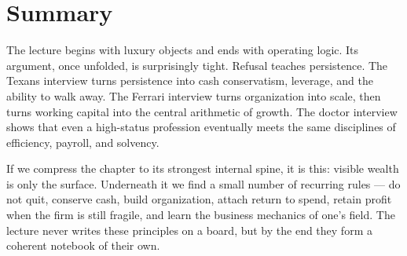\section{Summary}

The lecture begins with luxury objects and ends with operating logic. Its argument, once unfolded, is surprisingly tight. Refusal teaches persistence. The Texans interview turns persistence into cash conservatism, leverage, and the ability to walk away. The Ferrari interview turns organization into scale, then turns working capital into the central arithmetic of growth. The doctor interview shows that even a high-status profession eventually meets the same disciplines of efficiency, payroll, and solvency.

If we compress the chapter to its strongest internal spine, it is this: visible wealth is only the surface. Underneath it we find a small number of recurring rules --- do not quit, conserve cash, build organization, attach return to spend, retain profit when the firm is still fragile, and learn the business mechanics of one's field. The lecture never writes these principles on a board, but by the end they form a coherent notebook of their own.